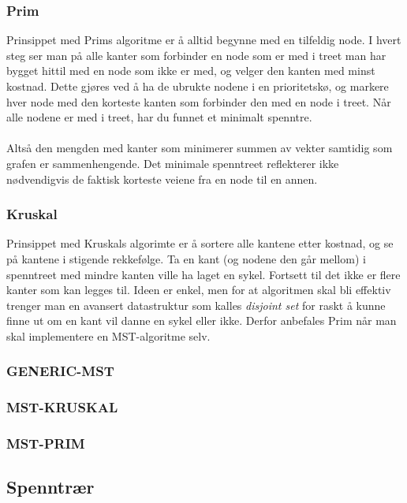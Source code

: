 \subsubsection{Prim}
Prinsippet med Prims algoritme er å alltid begynne med en tilfeldig node. I hvert steg ser man på alle kanter som forbinder en node som er med i treet man har bygget hittil med en node som ikke er med, og velger den kanten med minst kostnad. Dette gjøres ved å ha de ubrukte nodene i en prioritetskø, og markere hver node med den korteste kanten som forbinder den med en node i treet. Når alle nodene er med i treet, har du funnet et minimalt spenntre.
\\\\
Altså den mengden med kanter som minimerer summen av vekter samtidig som grafen er sammenhengende. Det minimale spenntreet reflekterer ikke nødvendigvis de faktisk korteste veiene fra en node til en annen.

\subsubsection{Kruskal}
Prinsippet med Kruskals algorimte er å sortere alle kantene etter kostnad, og se på kantene i stigende rekkefølge. Ta en kant (og nodene den går mellom) i spenntreet med mindre kanten ville ha laget en sykel. Fortsett til det ikke er flere kanter som kan legges til. Ideen er enkel, men for at algoritmen skal bli effektiv trenger man en avansert datastruktur som kalles \textit{disjoint set} for raskt å kunne finne ut om en kant vil danne en sykel eller ikke. Derfor anbefales Prim når man skal implementere en MST-algoritme selv.

\subsubsection{GENERIC-MST}
\subsubsection{MST-KRUSKAL}
\subsubsection{MST-PRIM}

\subsection{Spenntrær}
